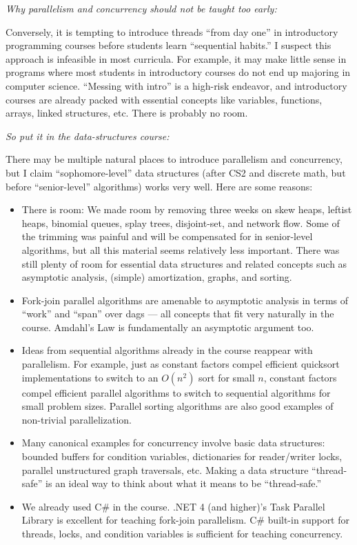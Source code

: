 \documentclass[10pt]{article}
\begin{document}
\medskip
\noindent \emph{Why parallelism and concurrency should not be taught too early:}
\medskip

Conversely, it is tempting to introduce threads ``from day one'' in
introductory programming courses before students learn ``sequential
habits.''  I suspect this approach is infeasible in most curricula.
For example, it may make little sense in programs where most students
in introductory courses do not end up majoring in computer science.
``Messing with intro'' is a high-risk endeavor, and introductory
courses are already packed with essential concepts like variables,
functions, arrays, linked structures, etc.  There is probably no room.

\medskip
\noindent \emph{So put it in the data-structures course:}
\medskip

There may be multiple natural places to introduce parallelism and
concurrency, but I claim ``sophomore-level'' data structures (after
CS2 and discrete math, but before ``senior-level'' algorithms) works
very well.  Here are some reasons:
\begin{itemize}
\item There is room: We made room by removing three weeks
  on skew heaps, leftist heaps, binomial queues, splay
  trees, disjoint-set, and network flow.  Some of the trimming was
  painful and will be compensated for in senior-level algorithms, but
  all this material seems relatively less important.  There was
  still plenty of room for essential data structures and related
  concepts such as asymptotic analysis, (simple) amortization, graphs,
  and sorting.
\item Fork-join parallel algorithms are amenable to asymptotic
  analysis in terms of ``work'' and ``span'' over dags --- all
  concepts that fit very naturally in the course.  Amdahl's Law is
  fundamentally an asymptotic argument too.
\item Ideas from sequential algorithms already in the course
  reappear with parallelism.  For example, just as constant factors compel
  efficient quicksort implementations to switch to an $O(n^2)$ sort
  for small $n$, constant factors compel efficient parallel
  algorithms to switch to sequential algorithms for small problem
  sizes.  Parallel sorting algorithms are also good examples of
  non-trivial parallelization.
\item Many canonical examples for concurrency involve basic
  data structures: bounded buffers for condition variables, dictionaries
  for reader/writer locks, parallel unstructured graph traversals,
  etc.  Making a data structure ``thread-safe'' is an ideal way to
  think about what it means to be ``thread-safe.''
\item We already used C\# in the course.  .NET 4 (and higher)'s Task Parallel Library
  is excellent for teaching fork-join parallelism.  C\# built-in
  support for threads, locks, and condition variables is sufficient
  for teaching concurrency.  
\end{itemize}
\end{document}
